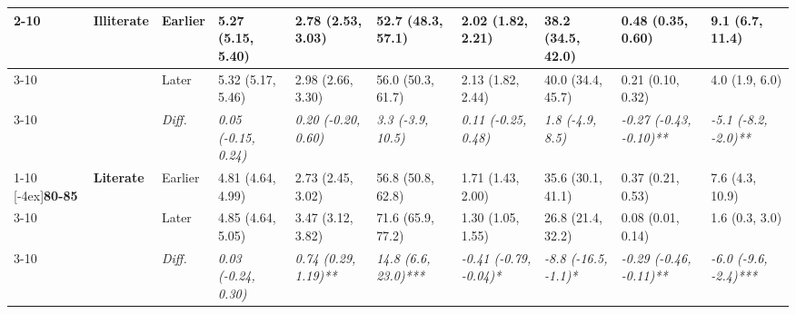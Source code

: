 \documentclass[12pt, a4paper]{article}
\begin{document}
\begin{appendices}
\begin{table}[!p]
{\begin{tabular}[t]{>{}l>{}lllllllll}
        \cmidrule{2-10}
                                              & \multirow{3}{*}{\textbf{Illiterate}} & Earlier                       & 5.27 (5.15, 5.40)                           & 2.78 (2.53, 3.03)                           & 52.7 (48.3, 57.1)                           & 2.02 (1.82, 2.21)                             & 38.2 (34.5, 42.0)                           & 0.48 (0.35, 0.60)                               & 9.1 (6.7, 11.4)                               \\
        \cmidrule{3-10}
                                              &                                      & Later                         & 5.32 (5.17, 5.46)                           & 2.98 (2.66, 3.30)                           & 56.0 (50.3, 61.7)                           & 2.13 (1.82, 2.44)                             & 40.0 (34.4, 45.7)                           & 0.21 (0.10, 0.32)                               & 4.0 (1.9, 6.0)                                \\
        \cmidrule{3-10}
                                              &                                      & \cellcolor{gray!10}\em{Diff.} & \cellcolor{gray!10}\em{0.05 (-0.15, 0.24)}  & \cellcolor{gray!10}\em{0.20 (-0.20, 0.60)}  & \cellcolor{gray!10}\em{3.3 (-3.9, 10.5)}    & \cellcolor{gray!10}\em{0.11 (-0.25, 0.48)}    & \cellcolor{gray!10}\em{1.8 (-4.9, 8.5)}     & \cellcolor{gray!10}\em{-0.27 (-0.43, -0.10)**}  & \cellcolor{gray!10}\em{-5.1 (-8.2, -2.0)**}   \\
        \cmidrule{1-10}
        \multirow{9}{*}[-4ex]{\textbf{80-85}} & \multirow{3}{*}{\textbf{Literate}}   & Earlier                       & 4.81 (4.64, 4.99)                           & 2.73 (2.45, 3.02)                           & 56.8 (50.8, 62.8)                           & 1.71 (1.43, 2.00)                             & 35.6 (30.1, 41.1)                           & 0.37 (0.21, 0.53)                               & 7.6 (4.3, 10.9)                               \\
        \cmidrule{3-10}
                                              &                                      & Later                         & 4.85 (4.64, 5.05)                           & 3.47 (3.12, 3.82)                           & 71.6 (65.9, 77.2)                           & 1.30 (1.05, 1.55)                             & 26.8 (21.4, 32.2)                           & 0.08 (0.01, 0.14)                               & 1.6 (0.3, 3.0)                                \\
        \cmidrule{3-10}
                                              &                                      & \cellcolor{gray!10}\em{Diff.} & \cellcolor{gray!10}\em{0.03 (-0.24, 0.30)}  & \cellcolor{gray!10}\em{0.74 (0.29, 1.19)**} & \cellcolor{gray!10}\em{14.8 (6.6, 23.0)***} & \cellcolor{gray!10}\em{-0.41 (-0.79, -0.04)*} & \cellcolor{gray!10}\em{-8.8 (-16.5, -1.1)*} & \cellcolor{gray!10}\em{-0.29 (-0.46, -0.11)**}  & \cellcolor{gray!10}\em{-6.0 (-9.6, -2.4)***}  \\

\end{tabular}}
\end{table}
\end{appendices}
\end{document}
